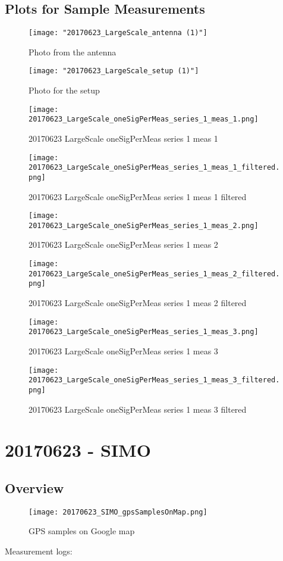 \subsection{Plots for Sample Measurements}
\begin{figure}[ht] \caption{Photo from the antenna}
\texttt{[image: "20170623\_LargeScale\_antenna (1)"]}\centering\end{figure}
\begin{figure}[ht] \caption{Photo for the setup}
\texttt{[image: "20170623\_LargeScale\_setup (1)"]}\centering\end{figure}
\begin{figure}[ht] \caption{20170623 LargeScale oneSigPerMeas series 1 meas 1}
\texttt{[image: 20170623\_LargeScale\_oneSigPerMeas\_series\_1\_meas\_1.png]}\centering\end{figure}
\begin{figure}[ht] \caption{20170623 LargeScale oneSigPerMeas series 1 meas 1 filtered}
\texttt{[image: 20170623\_LargeScale\_oneSigPerMeas\_series\_1\_meas\_1\_filtered.png]}\centering\end{figure}
\begin{figure}[ht] \caption{20170623 LargeScale oneSigPerMeas series 1 meas 2}
\texttt{[image: 20170623\_LargeScale\_oneSigPerMeas\_series\_1\_meas\_2.png]}\centering\end{figure}
\begin{figure}[ht] \caption{20170623 LargeScale oneSigPerMeas series 1 meas 2 filtered}
\texttt{[image: 20170623\_LargeScale\_oneSigPerMeas\_series\_1\_meas\_2\_filtered.png]}\centering\end{figure}
\begin{figure}[ht] \caption{20170623 LargeScale oneSigPerMeas series 1 meas 3}
\texttt{[image: 20170623\_LargeScale\_oneSigPerMeas\_series\_1\_meas\_3.png]}\centering\end{figure}
\begin{figure}[ht] \caption{20170623 LargeScale oneSigPerMeas series 1 meas 3 filtered}
\texttt{[image: 20170623\_LargeScale\_oneSigPerMeas\_series\_1\_meas\_3\_filtered.png]}\centering\end{figure}
\clearpage
\section{20170623 - SIMO}
\subsection{Overview}
\begin{figure}[ht] \caption{GPS samples on Google map}
\texttt{[image: 20170623\_SIMO\_gpsSamplesOnMap.png]}\centering\end{figure}
\begin{minipage}{\textwidth} Measurement logs:

 \end{minipage}
\clearpage
